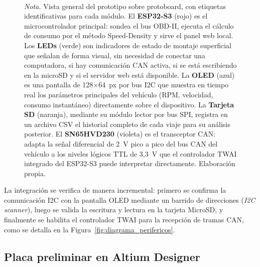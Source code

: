 \begin{figure}[H]
	\vspace{2pt}
	\\
	{\footnotesize\textit{Nota.} Vista general del prototipo sobre protoboard, con etiquetas identificativas para cada módulo. El \textbf{ESP32-S3} (rojo) es el microcontrolador principal: sondea el bus OBD-II, ejecuta el cálculo de consumo por el método Speed-Density y sirve el panel web local. Los \textbf{LEDs} (verde) son indicadores de estado de montaje superficial que señalan de forma visual, sin necesidad de conectar una computadora, si hay comunicación CAN activa, si se está escribiendo en la microSD y si el servidor web está disponible. La \textbf{OLED} (azul) es una pantalla de 128$\times$64~px por bus I2C que muestra en tiempo real los parámetros principales del vehículo (RPM, velocidad, consumo instantáneo) directamente sobre el dispositivo. La \textbf{Tarjeta SD} (naranja), mediante su módulo lector por bus SPI, registra en un archivo CSV el historial completo de cada viaje para su análisis posterior. El \textbf{SN65HVD230} (violeta) es el transceptor CAN: adapta la señal diferencial de 2~V pico a pico del bus CAN del vehículo a los niveles lógicos TTL de 3,3~V que el controlador TWAI integrado del ESP32-S3 puede interpretar directamente. Elaboración propia.}
	
\end{figure}

La integración se verifica de manera incremental: primero se confirma la comunicación I2C con la pantalla OLED mediante un barrido de direcciones (\textit{I2C scanner}), luego se valida la escritura y lectura en la tarjeta MicroSD, y finalmente se habilita el controlador TWAI para la recepción de tramas CAN, como se detalla en la Figura~\ref{fig:diagrama_perifericos}.

\subsection{Placa preliminar en Altium Designer}
\label{sec:placa_preliminar}

